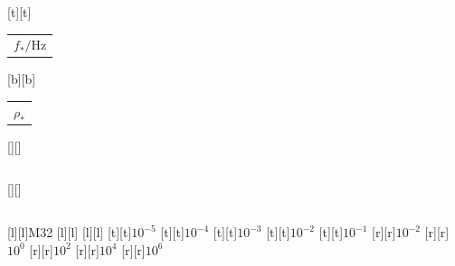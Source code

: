 %    
%
%
\begin{psfrags}%
\psfragscanon%
%
[t][t]{\color[rgb]{0,0,0}\setlength{\tabcolsep}{0pt}\begin{tabular}{c}{\Large$f_\ast/\mathrm{Hz}$}\end{tabular}}%
[b][b]{\color[rgb]{0,0,0}\setlength{\tabcolsep}{0pt}\begin{tabular}{c}{\Large$\rho_\ast$}\end{tabular}}%
[][]{\color[rgb]{0,0,0}\setlength{\tabcolsep}{0pt}\begin{tabular}{c} \end{tabular}}%
[][]{\color[rgb]{0,0,0}\setlength{\tabcolsep}{0pt}\begin{tabular}{c} \end{tabular}}%
[l][l]{\color[rgb]{0,0,0}M32}%
[l][l]{}%
[l][l]{}%
%
[t][t]{$10^{-5}$}%
[t][t]{$10^{-4}$}%
[t][t]{$10^{-3}$}%
[t][t]{$10^{-2}$}%
[t][t]{$10^{-1}$}%
%
[r][r]{$10^{-2}$}%
[r][r]{$10^{0}$}%
[r][r]{$10^{2}$}%
[r][r]{$10^{4}$}%
[r][r]{$10^{6}$}%
%
%
\end{psfrags}%
%
